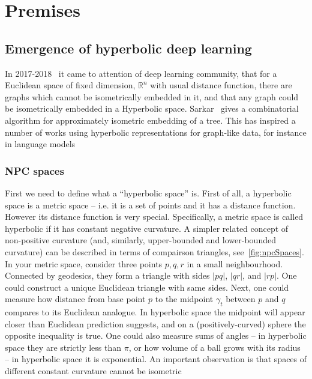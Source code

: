 %


\chapter{Premises} \label{chap:premises}

\section{Emergence of hyperbolic deep learning} \label{sec:history}

In 2017-2018~\cite{nickelKiela17} it came to attention of deep learning community, that for a
Euclidean space of fixed dimension, \( \mathbb{R}^n \) with usual distance
function, there are graphs which cannot be isometrically embedded in it, and
that any graph could be isometrically embedded in a Hyperbolic space.
Sarkar~\cite{sarkar} gives a combinatorial algorithm for approximately
isometric embedding of a tree. This has inspired a number of works using
hyperbolic representations for graph-like data, for instance in language models

\subsection*{NPC spaces}

First we need to define what a ``hyperbolic space'' is. First of all, a
hyperbolic space is a metric space -- i.e. it is a set of points and it has a
distance function. However its distance function is very special.
Specifically, a metric space is called hyperbolic if it has constant negative
curvature. A simpler related concept of non-positive curvature (and, similarly,
upper-bounded and lower-bounded curvature) can be described in terms of
compairson triangles, see~\autoref{fig:npcSpaces}. In your metric space,
consider three points $p, q, r$ in a small neighbourhood.  Connected by
geodesics, they form a triangle with sides $|pq|$, $|qr|$, and $|rp|$.  One
could construct a unique Euclidean triangle with same sides. Next, one could
measure how distance from base point $p$ to the midpoint $\gamma_t$ between $p$
and $q$ compares to its Euclidean analogue. In hyperbolic space the midpoint
will appear closer than Euclidean prediction suggests, and on a
(positively-curved) sphere the opposite inequality is true. One could also
measure sums of angles -- in hyperbolic space they are strictly less than
$\pi$, or how volume of a ball grows with its radius -- in hyperbolic space it
is exponential. An important observation is that spaces of different constant
curvature cannot be isometric

